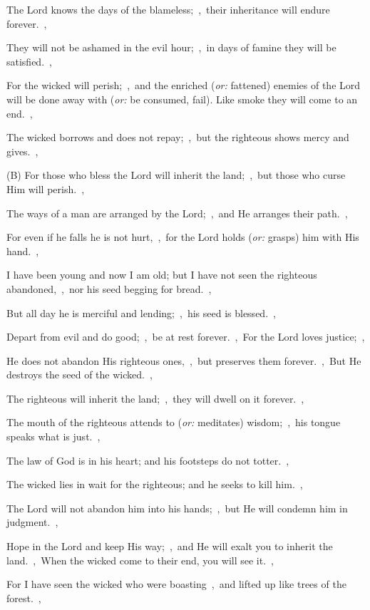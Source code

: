 \documentclass[12pt,twoside,a5paper]{article}
\newcommand{\translationoption}[1]{\emph{or:} #1}
\begin{document}
\begin{normalparskip}
  The Lord knows the days of the blameless;~\sep\ their inheritance will endure forever.~\sep

  They will not be ashamed in the evil hour;~\sep\ in days of famine they will be satisfied.~\sep

  For the wicked will perish;~\sep\ and the enriched (\translationoption{fattened}) enemies of the Lord will be done away with (\translationoption{be consumed, fail}). Like smoke they will come to an end.~\sep

  The wicked borrows and does not repay;~\sep\ but the righteous shows mercy and gives.~\sep

  (B) For those who bless the Lord will inherit the land;~\sep\ but those who curse Him will perish.~\sep

  The ways of a man are arranged by the Lord;~\sep\ and He arranges their path.~\sep

  For even if he falls he is not hurt,~\sep\ for the Lord holds (\translationoption{grasps}) him with His hand.~\sep

  I have been young and now I am old; but I have not seen the righteous abandoned,~\sep\ nor his seed begging for bread.~\sep

  But all day he is merciful and lending;~\sep\ his seed is blessed.~\sep

  Depart from evil and do good;~\sep\ be at rest forever.~\sep\ For the Lord loves justice;~\sep

  He does not abandon His righteous ones,~\sep\ but preserves them forever.~\sep\ But He destroys the seed of the wicked.~\sep

  The righteous will inherit the land;~\sep\ they will dwell on it forever.~\sep

  The mouth of the righteous attends to (\translationoption{meditates}) wisdom;~\sep\ his tongue speaks what is just.~\sep

  The law of God is in his heart; and his footsteps do not totter.~\sep

  The wicked lies in wait for the righteous; and he seeks to kill him.~\sep

  The Lord will not abandon him into his hands;~\sep\ but He will condemn him in judgment.~\sep

  Hope in the Lord and keep His way;~\sep\ and He will exalt you to inherit the land.~\sep\  When the wicked come to their end, you will see it.~\sep

  For I have seen the wicked who were boasting~\sep\ and lifted up like trees of the forest.~\sep


\end{normalparskip}
\end{document}
